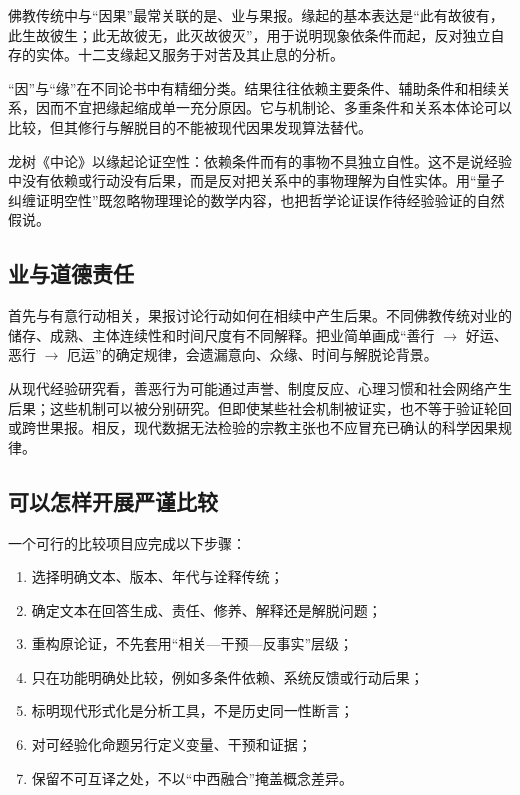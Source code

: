 佛教传统中与“因果”最常关联的是、业与果报。缘起的基本表达是“此有故彼有，此生故彼生；此无故彼无，此灭故彼灭”，用于说明现象依条件而起，反对独立自存的实体。十二支缘起又服务于对苦及其止息的分析。

“因”与“缘”在不同论书中有精细分类。结果往往依赖主要条件、辅助条件和相续关系，因而不宜把缘起缩成单一充分原因\parencite{gethin1998}。它与机制论、多重条件和关系本体论可以比较，但其修行与解脱目的不能被现代因果发现算法替代。

龙树《中论》以缘起论证空性：依赖条件而有的事物不具独立自性\parencite{nagarjuna}。这不是说经验中没有依赖或行动没有后果，而是反对把关系中的事物理解为自性实体。用“量子纠缠证明空性”既忽略物理理论的数学内容，也把哲学论证误作待经验验证的自然假说。

\subsection{业与道德责任}

首先与有意行动相关，果报讨论行动如何在相续中产生后果。不同佛教传统对业的储存、成熟、主体连续性和时间尺度有不同解释。把业简单画成“善行 $\rightarrow$ 好运、恶行 $\rightarrow$ 厄运”的确定规律，会遗漏意向、众缘、时间与解脱论背景。

从现代经验研究看，善恶行为可能通过声誉、制度反应、心理习惯和社会网络产生后果；这些机制可以被分别研究。但即使某些社会机制被证实，也不等于验证轮回或跨世果报。相反，现代数据无法检验的宗教主张也不应冒充已确认的科学因果规律。

\subsection{可以怎样开展严谨比较}

一个可行的比较项目应完成以下步骤：

\begin{enumerate}
  \item 选择明确文本、版本、年代与诠释传统；
  \item 确定文本在回答生成、责任、修养、解释还是解脱问题；
  \item 重构原论证，不先套用“相关---干预---反事实”层级；
  \item 只在功能明确处比较，例如多条件依赖、系统反馈或行动后果；
  \item 标明现代形式化是分析工具，不是历史同一性断言；
  \item 对可经验化命题另行定义变量、干预和证据；
  \item 保留不可互译之处，不以“中西融合”掩盖概念差异。
\end{enumerate}

